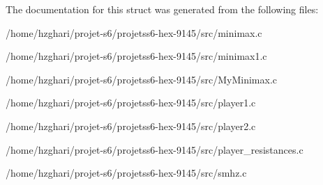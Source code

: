 The documentation for this struct was generated from the following files\+:\begin{DoxyCompactItemize}
\item 
/home/hzghari/projet-\/s6/projetss6-\/hex-\/9145/src/minimax.\+c\item 
/home/hzghari/projet-\/s6/projetss6-\/hex-\/9145/src/minimax1.\+c\item 
/home/hzghari/projet-\/s6/projetss6-\/hex-\/9145/src/My\+Minimax.\+c\item 
/home/hzghari/projet-\/s6/projetss6-\/hex-\/9145/src/player1.\+c\item 
/home/hzghari/projet-\/s6/projetss6-\/hex-\/9145/src/player2.\+c\item 
/home/hzghari/projet-\/s6/projetss6-\/hex-\/9145/src/player\+\_\+resistances.\+c\item 
/home/hzghari/projet-\/s6/projetss6-\/hex-\/9145/src/smhz.\+c\end{DoxyCompactItemize}
